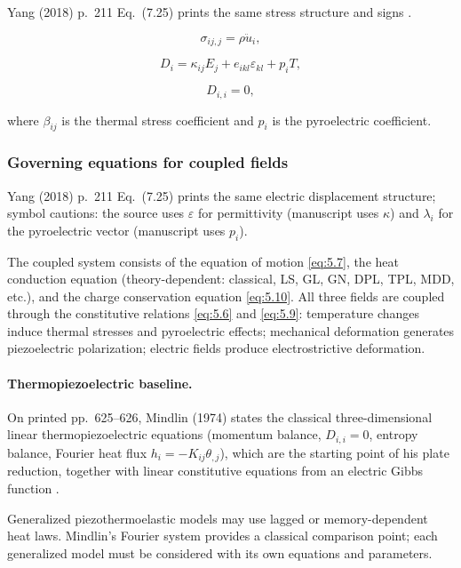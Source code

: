 Yang (2018) p.~211 Eq.~(7.25) prints the same stress structure and signs \cite{Yang2018}.

\begin{equation}
\sigma_{ij,j} = \rho\ddot{u}_i,
\label{eq:5.7}
\end{equation}

\begin{equation}
D_i = \kappa_{ij}E_j + e_{ikl}\varepsilon_{kl} + p_i T,
\label{eq:5.9}
\end{equation}

\begin{equation}
D_{i,i} = 0,
\label{eq:5.10}
\end{equation}

where $\beta_{ij}$ is the thermal stress coefficient and $p_i$ is the pyroelectric coefficient.

\subsubsection{Governing equations for coupled fields}

Yang (2018) p.~211 Eq.~(7.25) prints the same electric displacement structure; symbol cautions: the source uses $\varepsilon$ for permittivity (manuscript uses $\kappa$) and $\lambda_i$ for the pyroelectric vector (manuscript uses $p_i$).

The coupled system consists of the equation of motion \eqref{eq:5.7}, the heat conduction equation (theory-dependent: classical, LS, GL, GN, DPL, TPL, MDD, etc.), and the charge conservation equation \eqref{eq:5.10}. All three fields are coupled through the constitutive relations \eqref{eq:5.6} and \eqref{eq:5.9}: temperature changes induce thermal stresses and pyroelectric effects; mechanical deformation generates piezoelectric polarization; electric fields produce electrostrictive deformation.

\paragraph{Thermopiezoelectric baseline.} On printed pp.~625--626, Mindlin (1974) states the classical three-dimensional linear thermopiezoelectric equations (momentum balance, $D_{i,i}=0$, entropy balance, Fourier heat flux $h_i=-K_{ij}\theta_{,j}$), which are the starting point of his plate reduction, together with linear constitutive equations from an electric Gibbs function \cite{Mindlin1974Thermopiezo}\allowbreak{}.

Generalized piezothermoelastic models may use lagged or memory-dependent heat laws. Mindlin’s Fourier system provides a classical comparison point; each generalized model must be considered with its own equations and parameters.

